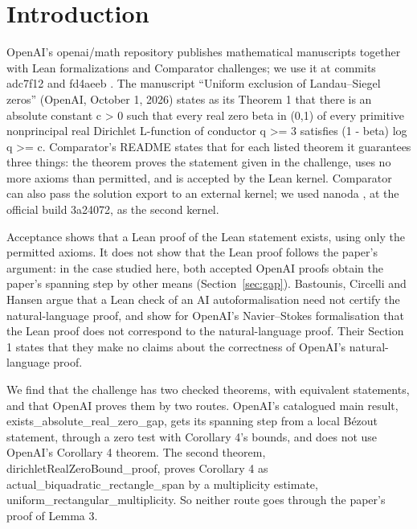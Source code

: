 \section{Introduction}\label{sec:intro}

OpenAI's openai/math repository publishes mathematical manuscripts together with Lean formalizations and Comparator challenges; we use it at commits adc7f12 and fd4aeeb \cite{openai-math-adc7f12,openai-math-fd4aeeb}.
The manuscript ``Uniform exclusion of Landau--Siegel zeros'' (OpenAI, October 1, 2026) \cite{openai-siegel-2026} states as its Theorem 1 that there is an absolute constant c > 0 such that every real zero beta in (0,1) of every primitive nonprincipal real Dirichlet L-function of conductor q >= 3 satisfies (1 - beta) log q >= c.
Comparator's README \cite{comparator} states that for each listed theorem it guarantees three things: the theorem proves the statement given in the challenge, uses no more axioms than permitted, and is accepted by the Lean kernel.
Comparator can also pass the solution export to an external kernel; we used nanoda \cite{nanoda-lib}, at the official build 3a24072, as the second kernel.

Acceptance shows that a Lean proof of the Lean statement exists, using only the permitted axioms.
It does not show that the Lean proof follows the paper's argument: in the case studied here, both accepted OpenAI proofs obtain the paper's spanning step by other means (Section~\ref{sec:gap}).
Bastounis, Circelli and Hansen \cite{bastounis2026} argue that a Lean check of an AI autoformalisation need not certify the natural-language proof, and show for OpenAI's Navier–Stokes formalisation that the Lean proof does not correspond to the natural-language proof.
Their Section 1 states that they make no claims about the correctness of OpenAI's natural-language proof.

We find that the challenge has two checked theorems, with equivalent statements, and that OpenAI proves them by two routes.
OpenAI's catalogued main result, exists\_absolute\_real\_zero\_gap, gets its spanning step from a local B\'ezout statement, through a zero test with Corollary 4's bounds, and does not use OpenAI's Corollary 4 theorem.
The second theorem, dirichletRealZeroBound\_proof, proves Corollary 4 as actual\_biquadratic\_rectangle\_span by a multiplicity estimate, uniform\_rectangular\_multiplicity.
So neither route goes through the paper's proof of Lemma 3.

